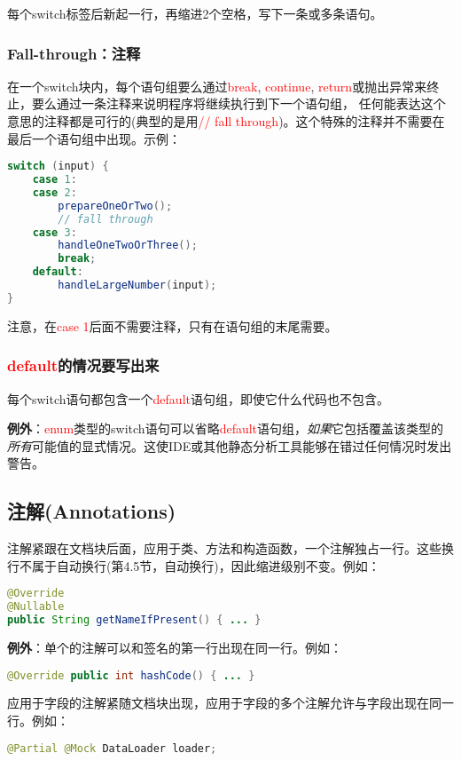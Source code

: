 \documentclass[cn,11pt,chinese]{elegantbook}
\begin{document}
每个switch标签后新起一行，再缩进2个空格，写下一条或多条语句。

\subsubsection{Fall-through：注释}
在一个switch块内，每个语句组要么通过\textcolor{red}{break}, \textcolor{red}{continue}, \textcolor{red}{return}或抛出异常来终止，要么通过一条注释来说明程序将继续执行到下一个语句组， 任何能表达这个意思的注释都是可行的(典型的是用\textcolor{red}{// fall through})。这个特殊的注释并不需要在最后一个语句组中出现。示例：
\begin{lstlisting}[language=java]
switch (input) {
	case 1:
	case 2:
		prepareOneOrTwo();
		// fall through
	case 3:
		handleOneTwoOrThree();
		break;
	default:
		handleLargeNumber(input);
}
\end{lstlisting}

注意，在\textcolor{red}{case 1}后面不需要注释，只有在语句组的末尾需要。

\subsubsection{\textcolor{red}{default}的情况要写出来}
每个switch语句都包含一个\textcolor{red}{default}语句组，即使它什么代码也不包含。

\textbf{例外}：\textcolor{red}{enum}类型的switch语句可以省略\textcolor{red}{default}语句组，\emph{如果}它包括覆盖该类型的\emph{所有}可能值的显式情况。这使IDE或其他静态分析工具能够在错过任何情况时发出警告。

\subsection{注解(Annotations)}
注解紧跟在文档块后面，应用于类、方法和构造函数，一个注解独占一行。这些换行不属于自动换行(第4.5节，自动换行)，因此缩进级别不变。例如：
\begin{lstlisting}[language=java]
@Override
@Nullable
public String getNameIfPresent() { ... }
\end{lstlisting}

\textbf{例外}：单个的注解可以和签名的第一行出现在同一行。例如：
\begin{lstlisting}[language=java]
@Override public int hashCode() { ... }
\end{lstlisting}

应用于字段的注解紧随文档块出现，应用于字段的多个注解允许与字段出现在同一行。例如：
\begin{lstlisting}[language=java]
@Partial @Mock DataLoader loader;
\end{lstlisting}
\end{document}
